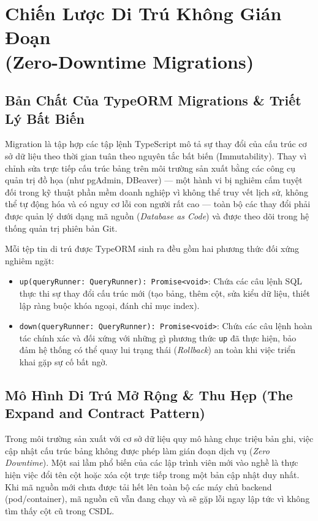 \documentclass[12pt,a4paper,oneside]{book}
\begin{document}
\chapter[Chiến Lược Di Trú Không Gián Đoạn]{Chiến Lược Di Trú Không Gián Đoạn\\(Zero-Downtime Migrations)}

\section{Bản Chất Của TypeORM Migrations \& Triết Lý Bất Biến}
Migration là tập hợp các tập lệnh TypeScript mô tả sự thay đổi của cấu trúc cơ sở dữ liệu theo thời gian tuân theo nguyên tắc bất biến (Immutability). Thay vì chỉnh sửa trực tiếp cấu trúc bảng trên môi trường sản xuất bằng các công cụ quản trị đồ họa (như pgAdmin, DBeaver) --- một hành vi bị nghiêm cấm tuyệt đối trong kỹ thuật phần mềm doanh nghiệp vì không thể truy vết lịch sử, không thể tự động hóa và có nguy cơ lỗi con người rất cao --- toàn bộ các thay đổi phải được quản lý dưới dạng mã nguồn (\textit{Database as Code}) và được theo dõi trong hệ thống quản trị phiên bản Git.

Mỗi tệp tin di trú được TypeORM sinh ra đều gồm hai phương thức đối xứng nghiêm ngặt:
\begin{itemize}
  \item \texttt{up(queryRunner: QueryRunner): Promise<void>}: Chứa các câu lệnh SQL thực thi sự thay đổi cấu trúc mới (tạo bảng, thêm cột, sửa kiểu dữ liệu, thiết lập ràng buộc khóa ngoại, đánh chỉ mục index).
  \item \texttt{down(queryRunner: QueryRunner): Promise<void>}: Chứa các câu lệnh hoàn tác chính xác và đối xứng với những gì phương thức \texttt{up} đã thực hiện, bảo đảm hệ thống có thể quay lui trạng thái (\textit{Rollback}) an toàn khi việc triển khai gặp sự cố bất ngờ.
\end{itemize}

\section{Mô Hình Di Trú Mở Rộng \& Thu Hẹp (The Expand and Contract Pattern)}
Trong môi trường sản xuất với cơ sở dữ liệu quy mô hàng chục triệu bản ghi, việc cập nhật cấu trúc bảng không được phép làm gián đoạn dịch vụ (\textit{Zero Downtime}). Một sai lầm phổ biến của các lập trình viên mới vào nghề là thực hiện việc đổi tên cột hoặc xóa cột trực tiếp trong một bản cập nhật duy nhất. Khi mã nguồn mới chưa được tải hết lên toàn bộ các máy chủ backend (pod/container), mã nguồn cũ vẫn đang chạy và sẽ gặp lỗi ngay lập tức vì không tìm thấy cột cũ trong CSDL.
\end{document}
